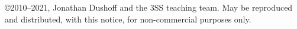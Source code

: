 \copyright 2010--2021, Jonathan Dushoff and the 3SS teaching team.  May be reproduced and distributed, with this notice, for non-commercial purposes only.
